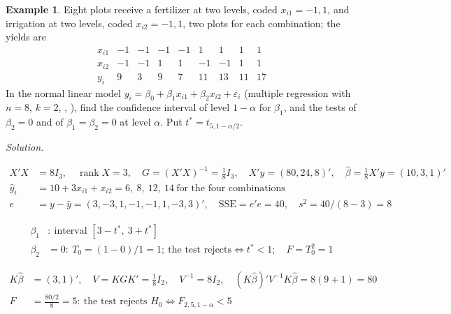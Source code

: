 \documentclass[12pt]{article}
\DeclareMathOperator{\col}{col}
\DeclareMathOperator{\rank}{rank}
\theoremstyle{definition}
\newtheorem{example}[theorem]{Example}
\newcommand{\boardtop}{\vspace*{-\abovedisplayskip}}
\DeclareMathOperator{\SE}{SE}
\begin{document}
\begin{example}\label{b14.15}
Eight plots receive a fertilizer at two levels, coded \(x_{i1}=-1,1\), and irrigation at two levels, coded
\(x_{i2}=-1,1\), two plots for each combination; the yields are
\[
\begin{array}{c|rrrrrrrr}
x_{i1}&-1&-1&-1&-1&1&1&1&1\\
x_{i2}&-1&-1&1&1&-1&-1&1&1\\\hline
y_i&9&3&9&7&11&13&11&17
\end{array}
\]
In the normal linear model \(y_i=\beta_0+\beta_1x_{i1}+\beta_2x_{i2}+\varepsilon_i\) (multiple regression with \(n=8\),
\(k=2\), , ), find the confidence interval of level \(1-\alpha\) for \(\beta_1\), and the tests of
\(\beta_2=0\) and of \(\beta_1=\beta_2=0\) at level \(\alpha\). Put \(t^*=t_{5,1-\alpha/2}\).
\end{example}
\textit{Solution.}
\begin{board}[The three columns of \(X\) are orthogonal with squared length \(8\) (\lec{1}, \lit{Theorem~4}(d));
\(X'X\) invertible \(\iff\) \(\rank X=3\) (\lec{11}, \lit{Theorem~2}(b)); under (A4), \(G=(X'X)^{-1}\), \(\beta^0=\hat\beta\),
\(r=3\) (Theorem~\ref{h-thm-t}); every \(a'\beta\) is estimable (Theorem~\ref{h-thm-estimable}(a)):]
\boardtop
\begin{align*}
X'X&=8I_3,\quad\rank X=3,\quad G=(X'X)^{-1}=\tfrac18I_3,\quad X'y=(80,24,8)',\quad\hat\beta=\tfrac18X'y=(10,3,1)'\\
\hat y_i&=10+3x_{i1}+x_{i2}=6,\ 8,\ 12,\ 14\ \text{for the four combinations}\\
e&=y-\hat y=(3,-3,1,-1,-1,1,-3,3)',\quad\mathrm{SSE}=e'e=40,\quad s^2=40/(8-3)=8
\end{align*}
\end{board}
\begin{board}[\(\SE(\hat\beta_j)=s\sqrt{1/8}=1\) (\(a'Ga=\frac18\) for \(a=\col_{j+1}(I_3)\)); Theorems~\ref{h-thm-t}(b),
\ref{h-thm-f}(b):]
\boardtop
\begin{align*}
\beta_1&:\ \text{interval }[3-t^*,\ 3+t^*]\\
\beta_2&=0:\ T_0=(1-0)/1=1;\ \text{the test rejects}\iff t^*<1;\quad F=T_0^2=1
\end{align*}
\end{board}
\begin{board}[\(\beta_1=\beta_2=0\) is \(K\beta=0\), \(K=\left(\begin{smallmatrix}0&1&0\\0&0&1\end{smallmatrix}\right)\),
\(\rank K=2\): testable under (A4) (the lines after Definition~\ref{h-def-testable}); Theorem~\ref{h-thm-f}(a),
\(q=2\):]
\boardtop
\begin{align*}
K\hat\beta&=(3,1)',\quad V=KGK'=\tfrac18I_2,\quad V^{-1}=8I_2,\quad(K\hat\beta)'V^{-1}K\hat\beta=8(9+1)=80\\
F&=\frac{80/2}8=5:\ \text{the test rejects }H_0\iff F_{2,5,1-\alpha}<5
\end{align*}
\end{board}
\end{document}
